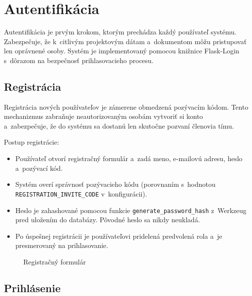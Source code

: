 \chapter{Autentifikácia}

        Autentifikácia je prvým krokom, ktorým prechádza každý používateľ systému.
Zabezpečuje, že k~citlivým projektovým dátam a~dokumentom môžu pristupovať len
oprávnené osoby. Systém je implementovaný pomocou knižnice Flask-Login s~dôrazom
na bezpečnosť prihlasovacieho procesu.

\section{Registrácia}

        Registrácia nových používateľov je zámerene obmedzená pozývacím kódom.
Tento mechanizmus zabraňuje neautorizovaným osobám vytvoriť si konto a~zabezpečuje,
že do systému sa dostanú len skutočne pozvaní členovia tímu.

        Postup registrácie:

\begin{itemize}
  \item Používateľ otvorí registračný formulár a~zadá meno, e-mailovú adresu,
        heslo a~pozývací kód.
  \item Systém overí správnosť pozývacieho kódu (porovnaním s~hodnotou \texttt{REGISTRATION\_INVITE\_CODE}
        v~konfigurácii).
  \item Heslo je zahashované pomocou funkcie \texttt{generate\_password\_hash} z~Werkzeug
        pred uložením do databázy. Pôvodné heslo sa nikdy neukladá.
  \item Po úspešnej registrácii je používateľovi pridelená predvolená rola a~je
        presmerovaný na prihlasovanie.
\end{itemize}

\begin{figure}[H]
  \centering
  \caption{Registračný formulár}
  \label{fig:registracia}
\end{figure}

\section{Prihlásenie}

